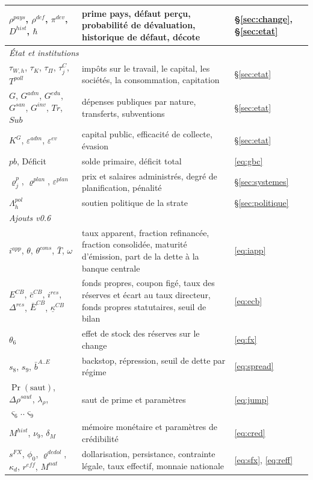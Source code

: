 \documentclass[11pt,a4paper]{article}
\begin{document}
\begin{longtable}{p{4.3cm}p{7.8cm}p{3.3cm}}
$\rho^{pays}$, $\rho^{def}$, $\pi^{dev}$, $D^{hist}$, $\hbar$ & prime pays, défaut perçu, probabilité de dévaluation, historique de défaut, décote & \S\ref{sec:change}, \S\ref{sec:etat}\\
\midrule
\multicolumn{3}{l}{\emph{État et institutions}}\\
$\tau_{W,h}$, $\tau_K$, $\tau_\Pi$, $\tau^C_j$, $T^{poll}$ & impôts sur le travail, le capital, les sociétés, la consommation, capitation & \S\ref{sec:etat}\\
$G$, $G^{adm}$, $G^{edu}$, $G^{san}$, $G^{inv}$, $Tr$, $Sub$ & dépenses publiques par nature, transferts, subventions & \S\ref{sec:etat}\\
$K^G$, $\varepsilon^{adm}$, $\varepsilon^{ev}$ & capital public, efficacité de collecte, évasion & \S\ref{sec:etat}\\
$pb$, Déficit & solde primaire, déficit total & \eqref{eq:gbc}\\
$\varrho^p_j$, $\varrho^{plan}$, $\varepsilon^{plan}$ & prix et salaires administrés, degré de planification, pénalité & \S\ref{sec:systemes}\\
$\Lambda^{pol}_h$ & soutien politique de la strate & \S\ref{sec:politique}\\
\midrule
\multicolumn{3}{l}{\emph{Ajouts v0.6}}\\
$i^{app}$, $\theta$, $\theta^{cons}$, $\bar T$, $\omega$ & taux apparent, fraction refinancée, fraction consolidée, maturité d'émission, part de la dette à la banque centrale & \eqref{eq:iapp}\\
$E^{CB}$, $\bar c^{CB}$, $i^{res}$, $\Delta^{res}$, $\bar E^{CB}$, $\underline\kappa^{CB}$ & fonds propres, coupon figé, taux des réserves et écart au taux directeur, fonds propres statutaires, seuil de bilan & \eqref{eq:ecb}\\
$\theta_6$ & effet de stock des réserves sur le change & \eqref{eq:fx}\\
$s_8$, $s_9$, $\bar b^{A..E}$ & backstop, répression, seuil de dette par régime & \eqref{eq:spread}\\
$\Pr(\text{saut})$, $\Delta\rho^{saut}$, $\lambda_\rho$, $\varsigma_6..\varsigma_9$ & saut de prime et paramètres & \eqref{eq:jump}\\
$M^{hist}$, $\nu_9$, $\delta_M$ & mémoire monétaire et paramètres de crédibilité & \eqref{eq:cred}\\
$s^{FX}$, $\phi_0$, $\varrho^{dedol}$, $\kappa_d$, $r^{eff}$, $M^{nat}$ & dollarisation, persistance, contrainte légale, taux effectif, monnaie nationale & \eqref{eq:sfx}, \eqref{eq:reff}\\

\end{longtable}
\end{document}
